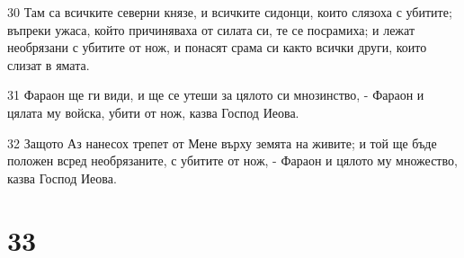 \par 30 Там са всичките северни князе, и всичките сидонци, които слязоха с убитите; въпреки ужаса, който причиняваха от силата си, те се посрамиха; и лежат необрязани с убитите от нож, и понасят срама си както всички други, които слизат в ямата.
\par 31 Фараон ще ги види, и ще се утеши за цялото си мнозинство, - Фараон и цялата му войска, убити от нож, казва Господ Иеова.
\par 32 Защото Аз нанесох трепет от Мене върху земята на живите; и той ще бъде положен всред необрязаните, с убитите от нож, - Фараон и цялото му множество, казва Господ Иеова.

\chapter{33}

